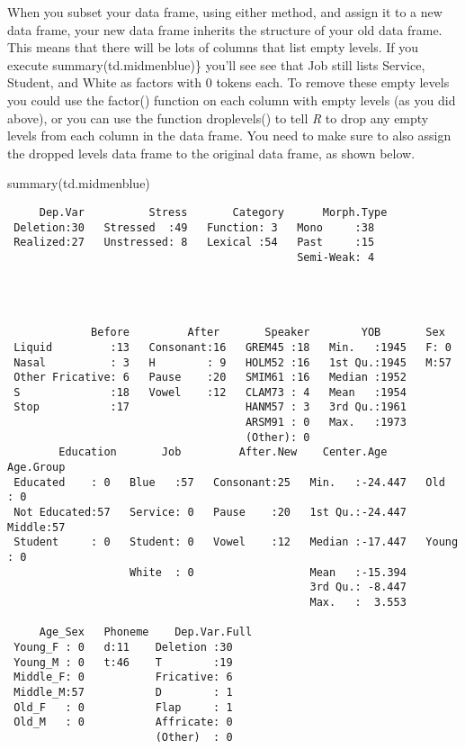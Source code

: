 \documentclass[
  12pt,
  letterpaper]{article}
\newenvironment{Shaded}{\begin{snugshade}}{\end{snugshade}}
\newcommand{\FunctionTok}[1]{\textcolor[rgb]{0.28,0.35,0.67}{#1}}
\newcommand{\NormalTok}[1]{\textcolor[rgb]{0.00,0.23,0.31}{#1}}
\renewcommand\texttt[1]{{\ttfamily\color{BrickRed}#1}}
\begin{document}
When you subset your data frame, using either method, and assign it to a
new data frame, your new data frame inherits the structure of your old
data frame. This means that there will be lots of columns that list
empty levels. If you execute \texttt{summary(td.midmenblue)\}} you'll
see see that \texttt{Job} still lists \texttt{Service},
\texttt{Student}, and \texttt{White} as factors with 0 tokens each. To
remove these empty levels you could use the \texttt{factor()} function
on each column with empty levels (as you did above), or you can use the
function \texttt{droplevels()} to tell \emph{R} to drop any empty levels
from each column in the data frame. You need to make sure to also assign
the dropped levels data frame to the original data frame, as shown
below.

\begin{Shaded}
\begin{Highlighting}[]
\FunctionTok{summary}\NormalTok{(td.midmenblue)}
\end{Highlighting}
\end{Shaded}

\begin{verbatim}
     Dep.Var          Stress       Category      Morph.Type
 Deletion:30   Stressed  :49   Function: 3   Mono     :38  
 Realized:27   Unstressed: 8   Lexical :54   Past     :15  
                                             Semi-Weak: 4  
                                                           
                                                           
                                                           
                                                           
             Before         After       Speaker        YOB       Sex   
 Liquid         :13   Consonant:16   GREM45 :18   Min.   :1945   F: 0  
 Nasal          : 3   H        : 9   HOLM52 :16   1st Qu.:1945   M:57  
 Other Fricative: 6   Pause    :20   SMIM61 :16   Median :1952         
 S              :18   Vowel    :12   CLAM73 : 4   Mean   :1954         
 Stop           :17                  HANM57 : 3   3rd Qu.:1961         
                                     ARSM91 : 0   Max.   :1973         
                                     (Other): 0                        
        Education       Job         After.New    Center.Age       Age.Group 
 Educated    : 0   Blue   :57   Consonant:25   Min.   :-24.447   Old   : 0  
 Not Educated:57   Service: 0   Pause    :20   1st Qu.:-24.447   Middle:57  
 Student     : 0   Student: 0   Vowel    :12   Median :-17.447   Young : 0  
                   White  : 0                  Mean   :-15.394              
                                               3rd Qu.: -8.447              
                                               Max.   :  3.553              
                                                                            
     Age_Sex   Phoneme    Dep.Var.Full
 Young_F : 0   d:11    Deletion :30   
 Young_M : 0   t:46    T        :19   
 Middle_F: 0           Fricative: 6   
 Middle_M:57           D        : 1   
 Old_F   : 0           Flap     : 1   
 Old_M   : 0           Affricate: 0   
                       (Other)  : 0   
\end{verbatim}
\end{document}
